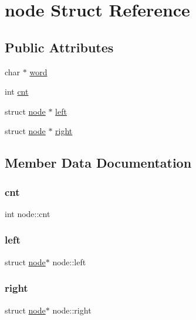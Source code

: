 \hypertarget{structnode}{}\section{node Struct Reference}
\label{structnode}
\subsection*{Public Attributes}
\begin{DoxyCompactItemize}
\item 
char $\ast$ \hyperlink{structnode_a13405da913d6af4193e14b60b8364d4d}{word}
\item 
int \hyperlink{structnode_a067231ed14deda86ad0d011e702a80a3}{cnt}
\item 
struct \hyperlink{structnode}{node} $\ast$ \hyperlink{structnode_a3ce38490a651bfda86d88ff955e96abc}{left}
\item 
struct \hyperlink{structnode}{node} $\ast$ \hyperlink{structnode_a875f75abfe22103500535b179828e4e3}{right}
\end{DoxyCompactItemize}


\subsection{Member Data Documentation}
\mbox{\label{structnode_a067231ed14deda86ad0d011e702a80a3}} 
\subsubsection{\texorpdfstring{cnt}{cnt}}
{\footnotesize\ttfamily int node\+::cnt}

\mbox{\label{structnode_a3ce38490a651bfda86d88ff955e96abc}} 
\subsubsection{\texorpdfstring{left}{left}}
{\footnotesize\ttfamily struct \hyperlink{structnode}{node}$\ast$ node\+::left}

\mbox{\label{structnode_a875f75abfe22103500535b179828e4e3}} 
\subsubsection{\texorpdfstring{right}{right}}
{\footnotesize\ttfamily struct \hyperlink{structnode}{node}$\ast$ node\+::right}

